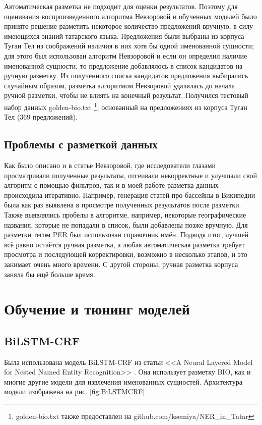 Автоматическая разметка не подходит для оценки результатов. Поэтому для оценивания воспроизведенного алгоритма Невзоровой и обученных моделей было принято решение разметить некоторое количество предложений вручную, в силу имеющихся знаний татарского языка. Предложения были выбраны из корпуса Туган Тел из соображений наличия в них хотя бы одной именованной сущности; для этого был использован алгоритм Невзоровой и если он определил наличие именованной сущности, то предложение добавлялось в список кандидатов на ручную разметку. Из полученного списка кандидатов предложения выбирались случайным образом, разметка алгоритмом Невзоровой удалялась до начала ручной разметки, чтобы не влиять на конечный результат. Получился тестовый набор данных golden-bio.txt \footnote{golden-bio.txt также предоставлен на github.com/ksemiya/NER\_in\_Tatar}, основанный на предложениях из корпуса Туган Тел (369 предложений).

\subsection{Проблемы с разметкой данных}

Как было описано и в статье Невзоровой, где исследователи глазами просматривали полученные результаты, отсеивали некорректные и улучшали свой алгоритм с помощью фильтров, так и в моей работе разметка данных происходила итеративно. Например, генерация статей про бассейны в Википедии была как раз выявлена в просмотре полученных результатов после разметки. Также выявлялись пробелы в алгоритме, например, некоторые географические названия, которые не попадали в список, были добавлены позже вручную. Для разметки тегом PER был использован справочник имён. Подводя итог, лучшей всё равно остаётся ручная разметка, а любая автоматическая разметка требует просмотра и последующей корректировки, возможно в несколько этапов, и это занимает очень много времени. С другой стороны, ручная разметка корпуса заняла бы ещё больше время.

\section{Обучение и тюнинг моделей}

\subsection{BiLSTM-CRF}

Была использована модель BiLSTM-CRF из статьи <<A Neural Layered Model for Nested Named Entity Recognition>> \cite{ju-etal-2018-neural}. Она использует разметку BIO, как и многие другие модели для извлечения именованных сущностей. Архитектура модели изображена на рис. \ref{fig:BiLSTMCRF}


